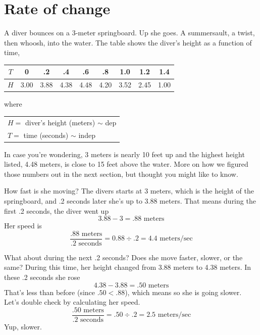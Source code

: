 
\section{Rate of change}



A diver bounces on a 3-meter springboard. Up she goes.  A summersault, a twist, then whoosh, into the water.  
The table shows the diver's height as a function of time, 

\begin{center}
\begin{tabular} {|c| | c|c|c|  c|c|c| c|c|} \hline
$T$ & 0 & .2 & .4 & .6 & .8 & 1.0 & 1.2 & 1.4 \\ \hline
$H$ & 3.00 & 3.88 & 4.38 & 4.48 & 4.20  & 3.52 & 2.45 & 1.00 \\ \hline
\end{tabular}
\end{center}
where \begin{center}
\begin{tabular} {l}
$H=$ diver's height (meters) $\sim$ dep \\
$T= $ time (seconds) $\sim$ indep \\ 
\end{tabular}
\end{center}

In case you're wondering, 3 meters is nearly 10 feet up and the highest height listed, 4.48 meters, is close to 15 feet above the water.  More on how we figured those numbers out in the next section, but thought you might like to know.  

How fast is she moving?  The divers starts at 3 meters, which is the height of the springboard, and .2 seconds later she's up to 3.88 meters.  That means during the first .2 seconds, the diver went up $$3.88-3 = .88 \text{ meters}$$
Her speed is  $$\frac{.88 \text{ meters}}{.2 \text{ seconds}} = 0.88 \div .2 = 4.4 \text{ meters/sec}$$

What about during the next .2 seconds?  Does she move faster, slower, or the same?  During this time, her height changed from 3.88 meters to 4.38 meters.  In these .2 seconds she rose $$4.38-3.88 = .50 \text{ meters}$$
That's less than before (since $.50 < .88$), which means so she is going slower.  Let's double check by calculating her speed.
$$\frac{.50 \text{ meters}}{.2 \text{ seconds}} = .50 \div .2 = 2.5 \text{ meters/sec}$$
Yup, slower.

